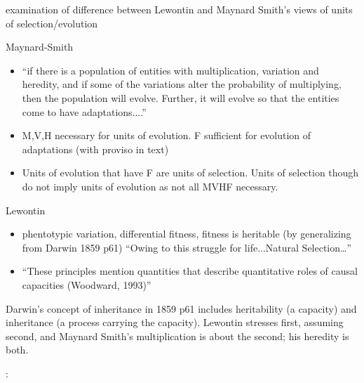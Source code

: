 \autocite{Griesemer2001}

examination of difference between Lewontin and Maynard Smith's views
of units of selection/evolution

Maynard-Smith
\begin{itemize}
	\item
	
	``if there is a population of entities with multiplication,
	variation and heredity, and if some of the variations alter the
	probability of multiplying, then the population will evolve.
	Further, it will evolve so that the entities come to have
	adaptations....''
	
	\item
	
	M,V,H necessary for units of evolution. F sufficient for evolution
	of adaptations (with proviso in text)
	
	\item
	
	Units of evolution that have F are units of selection. Units of
	selection though do not imply units of evolution as not all MVHF
	necessary.
	
\end{itemize}

Lewontin
\begin{itemize}
	\item
	
	phentotypic variation, differential fitness, fitness is heritable
	(by generalizing from Darwin 1859 p61) ``Owing to this struggle for
	life...Natural Selection\ldots{}''
	
	\item
	
	``These principles mention quantities that describe quantitative
	roles of causal capacities (Woodward, 1993)''
	
\end{itemize}

Darwin's concept of inheritance in 1859 p61 includes heritability (a capacity) and inheritance (a process carrying the capacity). Lewontin stresses first, assuming second, and Maynard Smith's multiplication is about the second; his heredity is both. \autocite{Griesemer2001}


\autocite{Godfrey-Smith2007}:

